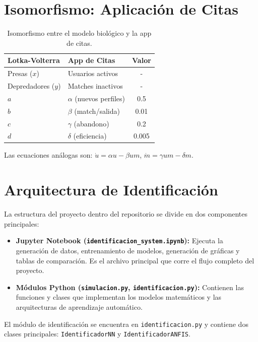 \documentclass[10pt,twocolumn]{article}
\begin{document}
\section{Isomorfismo: Aplicación de Citas}

\begin{table}[h]
\centering
\begin{tabular}{p{2.8cm}p{3.5cm}c}
\toprule
\textbf{Lotka-Volterra} & \textbf{App de Citas} & \textbf{Valor} \\
\midrule
Presas ($x$) & Usuarios activos & - \\
Depredadores ($y$) & Matches inactivos & - \\
$a$ & $\alpha$ (nuevos perfiles) & 0.5 \\
$b$ & $\beta$ (match/salida) & 0.01 \\
$c$ & $\gamma$ (abandono) & 0.2 \\
$d$ & $\delta$ (eficiencia) & 0.005 \\
\bottomrule
\end{tabular}
\caption{Isomorfismo entre el modelo biológico y la app de citas.}
\label{tab:isomorfismo}
\end{table}

Las ecuaciones análogas son: $\dot{u} = \alpha u - \beta um$, $\dot{m} = \gamma um - \delta m$.

\section{Arquitectura de Identificación}

La estructura del proyecto dentro del repositorio se divide en dos componentes principales:
\begin{itemize}
    \item \textbf{Jupyter Notebook (\texttt{identificacion\_system.ipynb}):} Ejecuta la generación de datos, entrenamiento de modelos, generación de gráficas y tablas de comparación. Es el archivo principal que corre el flujo completo del proyecto.
    \item \textbf{Módulos Python (\texttt{simulacion.py}, \texttt{identificacion.py}):} Contienen las funciones y clases que implementan los modelos matemáticos y las arquitecturas de aprendizaje automático.
\end{itemize}

El módulo de identificación se encuentra en \texttt{identificacion.py} y contiene dos clases principales: \texttt{IdentificadorNN} y \texttt{IdentificadorANFIS}.
\end{document}
